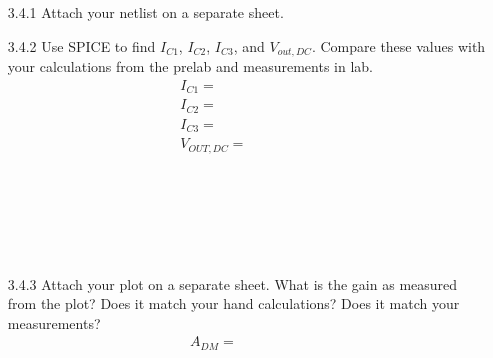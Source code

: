 \documentclass{article}
\begin{document}
\begin{enumerate}
  \item[3.4.1] Attach your netlist on a separate sheet.
  \item[3.4.2] Use SPICE to find $I_{C1}$, $I_{C2}$, $I_{C3}$, and $V_{out,DC}$. Compare these values with your calculations from the prelab and measurements in lab.
    \begin{align*}
      \boxed{I_{C1} = ~~~~~~~~~~~~~~~~~~~~~~ } \\
      \boxed{I_{C2} = ~~~~~~~~~~~~~~~~~~~~~~ } \\
      \boxed{I_{C3} = ~~~~~~~~~~~~~~~~~~~~~~ } \\
      \boxed{V_{OUT,DC} = ~~~~~~~~~~~~~~~~~~~~~~ } \\
    \end{align*}
    \\~\\~\\~\\~\\
  \item[3.4.3] Attach your plot on a separate sheet. What is the gain as measured from the plot? Does it match your hand calculations? Does it match your measurements?
    \begin{align*}
      \boxed{A_{DM} = ~~~~~~~~~~~~~~~~~~~~~~ }
    \end{align*}
    \\~\\~\\
\end{enumerate}
\end{document}
